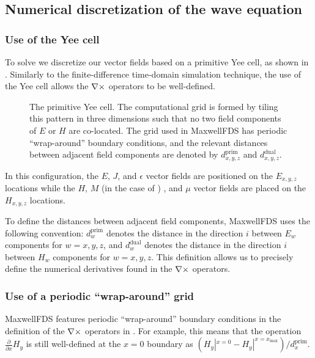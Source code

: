 \documentclass{article}
\newcommand{\MaxwellFDS}{MaxwellFDS }
\newcommand{\pf}[1]{\frac{\partial}{\partial #1}} %
\newcommand{\prim}{\text{prim}}
\newcommand{\dual}{\text{dual}}
\newcommand{\mx}{\text{max}}
\begin{document}
\subsection{Numerical discretization of the wave equation}
\subsubsection{Use of the Yee cell}
To solve  we discretize our vector fields 
    based on a primitive Yee cell, as shown in . %
Similarly to the finite-difference time-domain simulation technique,
    the use of the Yee cell allows the $\nabla\times$ operators to be well-defined.

\begin{figure}[ht]\begin{center}
    
    \end{center}
    \caption{   The primitive Yee cell. 
                The computational grid is formed by tiling this pattern
                    in three dimensions such that no two field components
                    of $E$ or $H$ are co-located. %
                The grid used in \MaxwellFDS has periodic ``wrap-around''
                    boundary conditions, and 
                    the relevant distances between adjacent field components
                    are denoted by $d^\prim_{x,y,z}$ and 
                    $d^\dual_{x,y,z}$.}
    \label{fig:yee cell}
\end{figure}

In this configuration, the $E$, $J$, and $\epsilon$ vector fields
    are positioned on the $E_{x,y,z}$ locations 
    while the $H$, $M$ (in the case of ) , and $\mu$
    vector fields are placed on the $H_{x,y,z}$ locations.

To define the distances between adjacent field components,
    \MaxwellFDS uses the following convention:
    \BI $d^\prim_{w}$ denotes the distance in the direction $i$
        between $E_w$ components for $w = x, y, z$, and
    \I  $d^\dual_{w}$ denotes the distance in the direction $i$
        between $H_w$ components for $w = x, y, z$. \EI
This definition allows us to precisely define the numerical derivatives
    found in the $\nabla\times$ operators.
    
\subsubsection{Use of a periodic ``wrap-around'' grid}
\MaxwellFDS features periodic ``wrap-around'' boundary conditions
    in the definition of the $\nabla\times$ operators in .
For example, this means that the operation $\pf{x}H_y$ is still well-defined
    at the $x=0$ boundary as 
    $(H_y|^{x=0} - H_y|^{x = x_\mx}) / d^\prim_x$.
\end{document}
